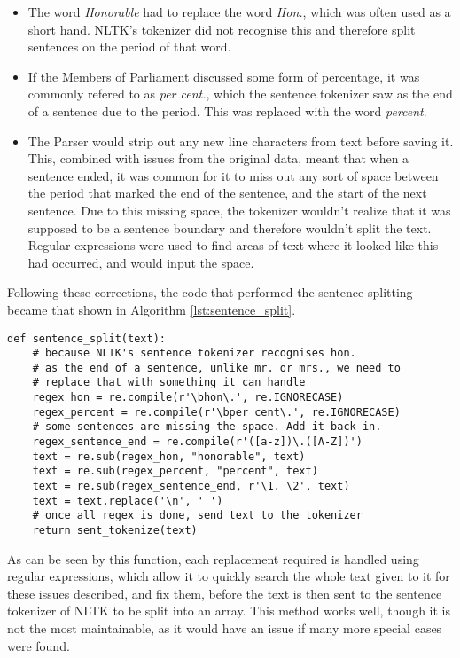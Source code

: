 \begin{itemize}
	\item The word \emph{Honorable} had to replace the word \emph{Hon.}, which was often used as a short hand. NLTK's tokenizer did not recognise this and therefore split sentences on the period of that word.
	\item If the Members of Parliament discussed some form of percentage, it was commonly refered to as \emph{per cent.}, which the sentence tokenizer saw as the end of a sentence due to the period. This was replaced with the word \emph{percent}.
	\item The Parser would strip out any new line characters from text before saving it. This, combined with issues from the original data, meant that when a sentence ended, it was common for it to miss out any sort of space between the period that marked the end of the sentence, and the start of the next sentence. Due to this missing space, the tokenizer wouldn't realize that it was supposed to be a sentence boundary and therefore wouldn't split the text. Regular expressions were used to find areas of text where it looked like this had occurred, and would input the space.
\end{itemize}
 
Following these corrections, the code that performed the sentence splitting became that shown in Algorithm \ref{lst:sentence_split}.

\begin{lstlisting}[float=ht,
				   caption={Sentence Splitting method, with included regular expressions},
				   label={lst:sentence_split}]
def sentence_split(text):
	# because NLTK's sentence tokenizer recognises hon.
	# as the end of a sentence, unlike mr. or mrs., we need to
    # replace that with something it can handle    
    regex_hon = re.compile(r'\bhon\.', re.IGNORECASE)
    regex_percent = re.compile(r'\bper cent\.', re.IGNORECASE)
    # some sentences are missing the space. Add it back in.
    regex_sentence_end = re.compile(r'([a-z])\.([A-Z])') 
    text = re.sub(regex_hon, "honorable", text)
    text = re.sub(regex_percent, "percent", text)
    text = re.sub(regex_sentence_end, r'\1. \2', text)
    text = text.replace('\n', ' ')
    # once all regex is done, send text to the tokenizer
    return sent_tokenize(text)
\end{lstlisting}

As can be seen by this function, each replacement required is handled using regular expressions, which allow it to quickly search the whole text given to it for these issues described, and fix them, before the text is then sent to the sentence tokenizer of NLTK to be split into an array. This method works well, though it is not the most maintainable, as it would have an issue if many more special cases were found.

